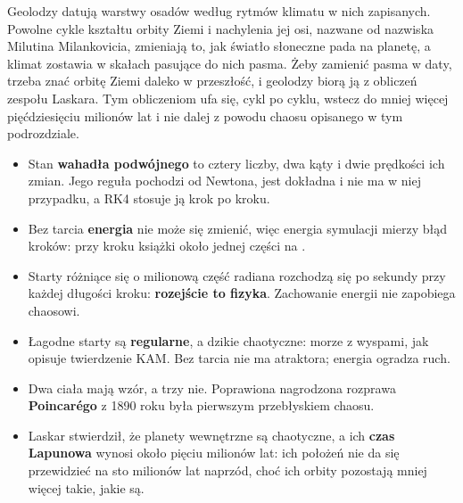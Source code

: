 \begin{worldbox}
Geolodzy datują warstwy osadów według rytmów klimatu w nich zapisanych.
Powolne cykle kształtu orbity Ziemi i nachylenia jej osi, nazwane od
nazwiska Milutina Milankovicia, zmieniają to, jak światło słoneczne pada na
planetę, a klimat zostawia w skałach pasujące do nich pasma. Żeby zamienić
pasma w daty, trzeba znać orbitę Ziemi daleko w przeszłość, i geolodzy biorą
ją z obliczeń zespołu Laskara. Tym obliczeniom ufa się, cykl po cyklu, wstecz
do mniej więcej pięćdziesięciu milionów lat i nie dalej \dash{} z powodu
chaosu opisanego w tym podrozdziale.
\end{worldbox}

\begin{summarybox}
\begin{itemize}
\item Stan \textbf{wahadła podwójnego} to cztery liczby, dwa kąty i dwie
  prędkości ich zmian. Jego reguła pochodzi od Newtona, jest dokładna i nie
  ma w niej przypadku, a RK4 stosuje ją krok po kroku.
\item Bez tarcia \textbf{energia} nie może się zmienić, więc energia
  symulacji mierzy błąd kroków: przy kroku książki około jednej części na
  .
\item Starty różniące się o milionową część radiana rozchodzą się po
   sekundy przy każdej długości kroku:
  \textbf{rozejście to fizyka}. Zachowanie energii nie zapobiega chaosowi.
\item Łagodne starty są \textbf{regularne}, a dzikie chaotyczne: morze z
  wyspami, jak opisuje twierdzenie KAM. Bez tarcia nie ma atraktora; energia
  ogradza ruch.
\item Dwa ciała mają wzór, a trzy nie. Poprawiona nagrodzona rozprawa
  \textbf{Poincarégo} z 1890 roku była pierwszym przebłyskiem chaosu.
\item Laskar stwierdził, że planety wewnętrzne są chaotyczne, a ich
  \textbf{czas Lapunowa} wynosi około pięciu milionów lat: ich położeń nie da
  się przewidzieć na sto milionów lat naprzód, choć ich orbity pozostają
  mniej więcej takie, jakie są.
\end{itemize}
\end{summarybox}

\canyou

